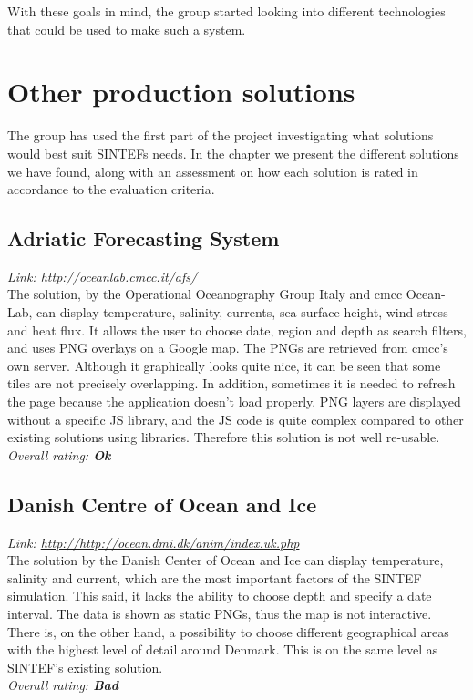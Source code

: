 \documentclass[11pt,a4paper,titlepage,oneside]{report}
\begin{document}
With these goals in mind, the group started looking into different technologies that could be used to make such a system.

\section{Other production solutions}
The group has used the first part of the project investigating what solutions would best suit SINTEFs needs. In the chapter we present the different solutions we have found, along with an assessment on how each solution is rated in accordance to the evaluation criteria. 

\subsection{Adriatic Forecasting System}
\emph{Link: \url{http://oceanlab.cmcc.it/afs/}} \\%
  The solution, by the Operational Oceanography Group Italy and cmcc Ocean-Lab, can display temperature, salinity, currents, sea surface height, wind stress and heat flux. It allows the user to choose date, region and depth as search filters, and uses PNG overlays on a Google map. The PNGs are retrieved from cmcc's own server.
  Although it graphically looks quite nice, it can be seen that some tiles are not precisely overlapping. In addition, sometimes it is needed to refresh the page because the application doesn't load properly. PNG layers are displayed without a specific JS library, and the JS code is quite complex compared to other existing solutions using libraries. Therefore this solution is not well re-usable.
\\ \emph{Overall rating: \textbf{Ok}}

\subsection{Danish Centre of Ocean and Ice}
  \emph{Link: \url{http://http://ocean.dmi.dk/anim/index.uk.php }} \\%
    The solution by the Danish Center of Ocean and Ice can display temperature, salinity and current, which are the most important factors of the SINTEF simulation. This said, it lacks the ability to choose depth and specify a date interval. The data is shown as static PNGs, thus the map is not interactive. There is, on the other hand, a possibility to choose different geographical areas with the highest level of detail around Denmark. This is on the same level as SINTEF's existing solution.
  \\ \emph{Overall rating: \textbf{Bad}}
\end{document}
